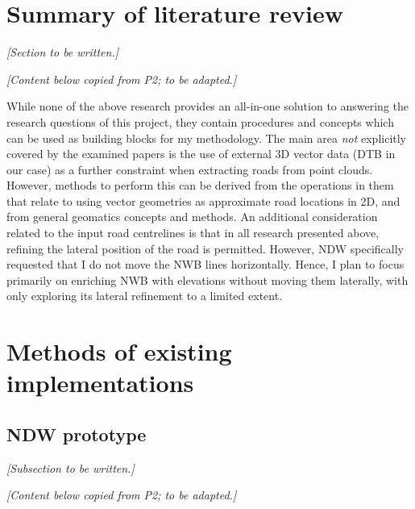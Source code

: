 \section{Summary of literature review}
\label{sec:rwsummary}

\textit{[Section to be written.]}

\textit{[Content below copied from P2; to be adapted.]}

While none of the above research provides an all-in-one solution to answering the research questions of this project, they contain procedures and concepts which can be used as building blocks for my methodology. The main area \textit{not} explicitly covered by the examined papers is the use of external 3D vector data (DTB in our case) as a further constraint when extracting roads from point clouds. However, methods to perform this can be derived from the operations in them that relate to using vector geometries as approximate road locations in 2D, and from general geomatics concepts and methods. An additional consideration related to the input road centrelines is that in all research presented above, refining the lateral position of the road is permitted. However, NDW specifically requested that I do not move the NWB lines horizontally. Hence, I plan to focus primarily on enriching NWB with elevations without moving them laterally, with only exploring its lateral refinement to a limited extent.

\section{Methods of existing implementations}
\label{sec:methodsexisting}

\subsection{NDW prototype}
\label{sub:ndwprototype}

\textit{[Subsection to be written.]}

\textit{[Content below copied from P2; to be adapted.]}

